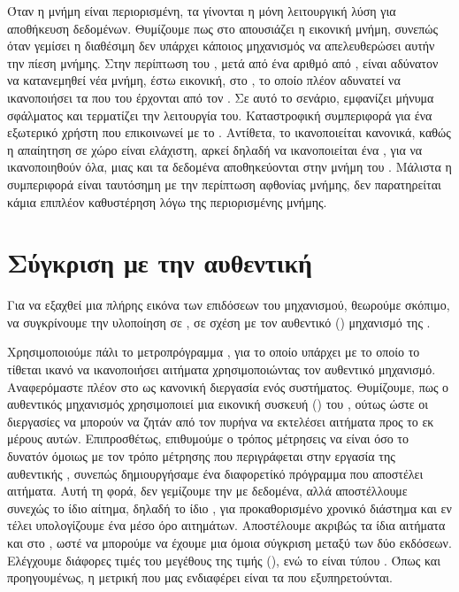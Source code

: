 Όταν η μνήμη είναι περιορισμένη, τα  γίνονται η
μόνη λειτουργική λύση για αποθήκευση δεδομένων. Θυμίζουμε
πως στο  απουσιάζει η εικονική μνήμη, συνεπώς όταν
γεμίσει η διαθέσιμη δεν υπάρχει κάποιος μηχανισμός να απελευθερώσει
αυτήν την πίεση μνήμης. Στην περίπτωση του , μετά από ένα
αριθμό από , είναι αδύνατον να κατανεμηθεί νέα μνήμη, έστω
εικονική, στο , το οποίο πλέον αδυνατεί να ικανοποιήσει
τα  που του έρχονται από τον . Σε αυτό το σενάριο, εμφανίζει
μήνυμα σφάλματος και τερματίζει την λειτουργία του. Καταστροφική
συμπεριφορά για ένα εξωτερικό χρήστη που επικοινωνεί με το
. Αντίθετα, το  ικανοποιείται κανονικά, καθώς η
απαίητηση σε χώρο είναι ελάχιστη, αρκεί δηλαδή να ικανοποιείται
ένα , για να ικανοποιηθούν όλα, μιας και τα δεδομένα
αποθηκεύονται στην μνήμη του . Μάλιστα η συμπεριφορά είναι
ταυτόσημη με την περίπτωση αφθονίας μνήμης, δεν παρατηρείται κάμια επιπλέον
καθυστέρηση λόγω της περιορισμένης μνήμης.







\section{Σύγκριση με την αυθεντική }

Για να εξαχθεί μια πλήρης εικόνα των επιδόσεων του μηχανισμού, θεωρούμε σκόπιμο,
να συγκρίνουμε την  υλοποίηση σε , σε σχέση με τον
αυθεντικό () μηχανισμό της .
\newline

Χρησιμοποιούμε πάλι το μετροπρόγραμμα , για το οποίο υπάρχει
 με το οποίο το  τίθεται ικανό να ικανοποιήσει 
αιτήματα χρησιμοποιώντας τον αυθεντικό μηχανισμό. Αναφερόμαστε πλέον στο
 ως κανονική διεργασία ενός  συστήματος. Θυμίζουμε, πως ο
αυθεντικός μηχανισμός χρησιμοποιεί μια εικονική συσκευή () του ,
ούτως ώστε οι διεργασίες να μπορούν να ζητάν από τον πυρήνα να
εκτελέσει  αιτήματα προς το  εκ μέρους αυτών. Επιπροσθέτως,
επιθυμούμε ο τρόπος μέτρησεις να είναι όσο το δυνατόν όμοιως με τον τρόπο
μέτρησης που περιγράφεται στην εργασία της αυθεντικής  \cite{Aimilios}, συνεπώς
δημιουργήσαμε ένα διαφορετίκό πρόγραμμα  που αποστέλει αιτήματα. Αυτή τη φορά,
δεν γεμίζουμε την  με δεδομένα, αλλά αποστέλλουμε συνεχώς το ίδιο αίτημα,
δηλαδή το ίδιο , για προκαθορισμένο χρονικό διάστημα και εν τέλει υπολογίζουμε ένα
μέσο όρο αιτημάτων. Αποστέλουμε ακριβώς τα ίδια αιτήματα και στο , ωστέ
να μπορούμε να έχουμε μια όμοια σύγκριση μεταξύ των δύο εκδόσεων. Ελέγχουμε διάφορες τιμές του μεγέθους της τιμής (),
ενώ το  είναι τύπου . Όπως και προηγουμένως, η μετρική που
μας ενδιαφέρει είναι τα  που εξυπηρετούνται.
\newline

